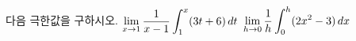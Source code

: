 다음 극한값을 구하시오.
 $\displaystyle\lim_{x\to 1}\dfrac{1}{x-1}\int_{1}^{x}(3t+6)\mkern3mu dt$
 $\displaystyle\lim_{h\to 0}\dfrac{1}{h}\int_{0}^{h}(2x^2-3)\mkern3mu dx$
